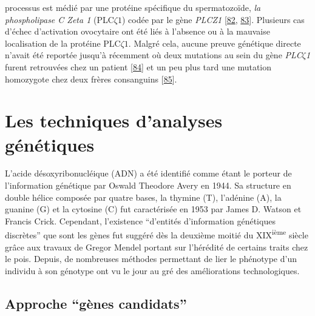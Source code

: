 \documentclass[12pt,twoside]{ugathesis}
\theoremstyle{definition}
\theoremstyle{definition}
\theoremstyle{remark}
\begin{document}
\begin{enumerate}
  processus est médié par une protéine spécifique du spermatozoïde,
  \emph{la phospholipase C Zeta 1} (PLC\(\zeta 1\)) codée par le gène
  \emph{PLCZ1} {[}\protect\hyperlink{ref-Nomikos2013}{82},
  \protect\hyperlink{ref-Amdani2013}{83}{]}. Plusieurs cas d'échec
  d'activation ovocytaire ont été liés à l'absence ou à la mauvaise
  localisation de la protéine PLC\(\zeta1\). Malgré cela, aucune preuve
  génétique directe n'avait été reportée jusqu'à récemment où deux
  mutations au sein du gène \emph{PLC}\(\zeta\)\emph{1} furent
  retrouvées chez un patient
  {[}\protect\hyperlink{ref-Heytens2009}{84}{]} et un peu plus tard une
  mutation homozygote chez deux frères consanguins
  {[}\protect\hyperlink{ref-Escoffier2016}{85}{]}.
\end{enumerate}

\newpage  

\section{Les techniques d'analyses
génétiques}\label{les-techniques-danalyses-genetiques}

L'acide désoxyribonucléique (ADN) a été identifié comme étant le porteur
de l'information génétique par Oswald Theodore Avery en 1944. Sa
structure en double hélice composée par quatre bases, la thymine (T),
l'adénine (A), la guanine (G) et la cytosine (C) fut caractérisée en
1953 par James D. Watson et Francis Crick. Cependant, l'existence
``d'entités d'information génétiques discrètes'' que sont les gènes fut
suggéré dès la deuxième moitié du XIX\textsuperscript{ième} siècle grâce
aux travaux de Gregor Mendel portant sur l'hérédité de certains traits
chez le pois. Depuis, de nombreuses méthodes permettant de lier le
phénotype d'un individu à son génotype ont vu le jour au gré des
améliorations technologiques.

\subsection{\texorpdfstring{Approche ``gènes
candidats''}{Approche gènes candidats}}\label{approche-genes-candidats}
\end{document}
